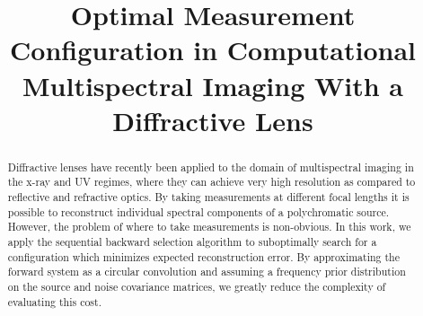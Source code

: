 \documentclass{article}
\title{Optimal Measurement Configuration in Computational \\ Multispectral Imaging With a Diffractive Lens}
\begin{document}
\maketitle

\begin{abstract}

Diffractive lenses have recently been applied to the domain of multispectral
imaging in the x-ray and UV regimes, where they can achieve very high resolution
as compared to reflective and refractive optics. By taking measurements at
different focal lengths it is possible to reconstruct individual spectral
components of a polychromatic source. However, the problem of where to take
measurements is non-obvious.  In this work, we apply the sequential backward selection
algorithm to suboptimally search for a configuration which minimizes expected
reconstruction error. By approximating the forward system as a circular
convolution and assuming a frequency prior distribution on the source and noise
covariance matrices, we greatly reduce the complexity of evaluating this cost.

\end{abstract}
\end{document}
